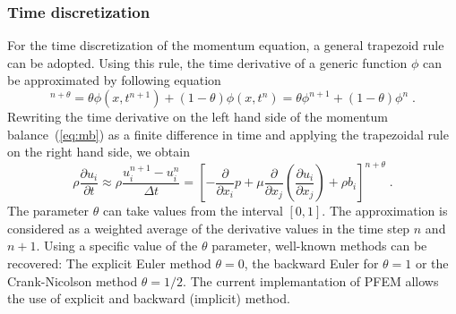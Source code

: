 \documentclass[a4paper]{report}
\newcommand{\pard}[2]{\frac{\partial{#1}}{\partial{#2}}}
\begin{document}
\subsubsection{Time discretization}
For the time discretization of the momentum equation, a general trapezoid rule can be adopted. Using this rule, the time derivative of a generic function $\phi$ can be approximated by following equation
\begin{equation}
[\phi(x,t)]^{n+\theta} = \theta\phi(x,t^{n+1})+(1-\theta)\phi(x,t^n)=\theta\phi^{n+1}+(1-\theta)\phi^n\;.
\end{equation}
Rewriting the time derivative on the left hand side of the momentum balance~(\ref{eq:mb}) as a finite difference in time and applying the trapezoidal rule on the right hand side, we obtain
\begin{equation}\label{eq:momentum-general}
  \rho\pard{u_i}{t} \approx \rho\frac{u^{n+1}_i-u^n_i}{\Delta t}= \left[ - \frac{\partial}{\partial x_i}p+\mu\frac{\partial}{\partial x_j}\left(\frac{\partial u_i}{\partial x_j}\right)+\rho b_i\right]^{n+\theta}\;.
\end{equation}
The parameter $\theta$ can take values from the interval $[0,1]$.  The approximation is considered as a weighted average of the derivative values in the time step $n$ and $n+1$. Using a specific value of the $\theta$ parameter, well-known methods can be recovered: The explicit Euler method $\theta=0$, the backward Euler for $\theta=1$ or the Crank-Nicolson method $\theta=1/2$. The current implemantation of PFEM allows the use of explicit and backward (implicit) method.
\end{document}
